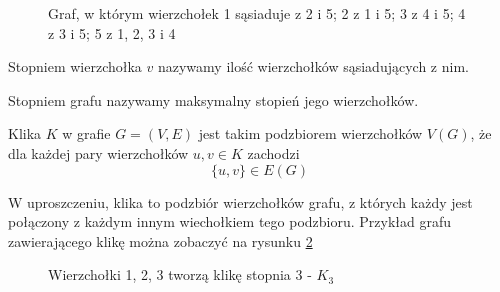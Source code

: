   \begin{figure}[H]
    \centering
    \caption{Graf, w którym wierzchołek 1 sąsiaduje z 2 i 5; 2 z 1 i 5; 3 z 4 i 5; 4 z 3 i 5; 5 z 1, 2, 3 i 4 }
    \label{sasie}
  \end{figure}
  
     \begin{definition}
	Stopniem wierzchołka $v$ nazywamy ilość wierzchołków sąsiadujących z nim.
   \end{definition}
   
    \begin{definition}
 Stopniem grafu nazywamy maksymalny stopień jego wierzchołków. 
   \end{definition}

   \begin{definition}[Klika]
    Klika $K$ w grafie $G=(V,E)$ jest takim podzbiorem wierzchołków $V(G)$, że dla każdej pary wierzchołków $u, v \in K$ zachodzi $$\{u,v\} \in E(G)$$ 
   \end{definition}
   
   W uproszczeniu, klika to podzbiór wierzchołków grafu, z których każdy jest połączony z każdym innym wiechołkiem tego podzbioru. Przykład grafu zawierającego klikę można zobaczyć na rysunku \ref{klik}
   \begin{figure}[H]
   \centering
     \caption{Wierzchołki 1, 2, 3 tworzą klikę stopnia 3 - $K_3$ }
     \label{klik}
  \end{figure}

